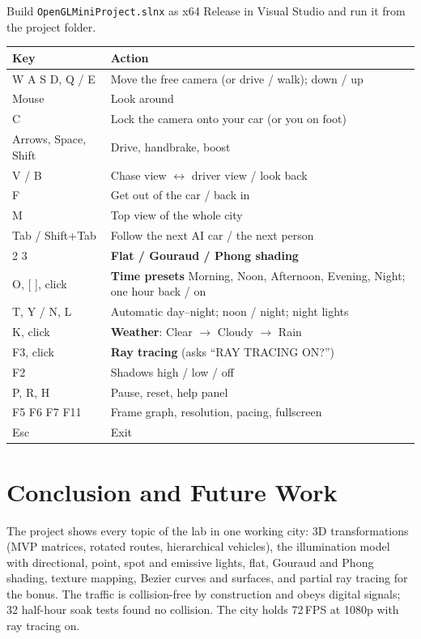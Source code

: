 \documentclass[11pt,a4paper]{article}
\newcommand{\code}[1]{\texttt{\small #1}}
\begin{document}
Build \code{OpenGLMiniProject.slnx} as x64 Release in Visual Studio and run it from the project folder.

\begin{longtable}{@{}>{\ttfamily}p{38mm} p{118mm}@{}}
\toprule
\normalfont\bfseries Key & \bfseries Action \\ \midrule
\endhead
W A S D, Q / E & Move the free camera (or drive / walk); down / up \\
Mouse & Look around \\
C & Lock the camera onto your car (or you on foot) \\
Arrows, Space, Shift & Drive, handbrake, boost \\
V / B & Chase view $\leftrightarrow$ driver view / look back \\
F & Get out of the car / back in \\
M & Top view of the whole city \\
Tab / Shift+Tab & Follow the next AI car / the next person \\
1 2 3 & \textbf{Flat / Gouraud / Phong shading} \\
O, [ ], click & \textbf{Time presets} Morning, Noon, Afternoon, Evening, Night; one hour back / on \\
T, Y / N, L & Automatic day--night; noon / night; night lights \\
K, click & \textbf{Weather}: Clear $\rightarrow$ Cloudy $\rightarrow$ Rain \\
F3, click & \textbf{Ray tracing} (asks ``RAY TRACING ON?'') \\
F2 & Shadows high / low / off \\
P, R, H & Pause, reset, help panel \\
F5 F6 F7 F11 & Frame graph, resolution, pacing, fullscreen \\
Esc & Exit \\
\bottomrule
\end{longtable}

\section{Conclusion and Future Work}

The project shows every topic of the lab in one working city: 3D transformations (MVP matrices, rotated routes, hierarchical vehicles), the illumination model with directional, point, spot and emissive lights, flat, Gouraud and Phong shading, texture mapping, Bezier curves and surfaces, and partial ray tracing for the bonus. The traffic is collision-free by construction and obeys digital signals; 32 half-hour soak tests found no collision. The city holds 72\,FPS at 1080p with ray tracing on.
\end{document}
